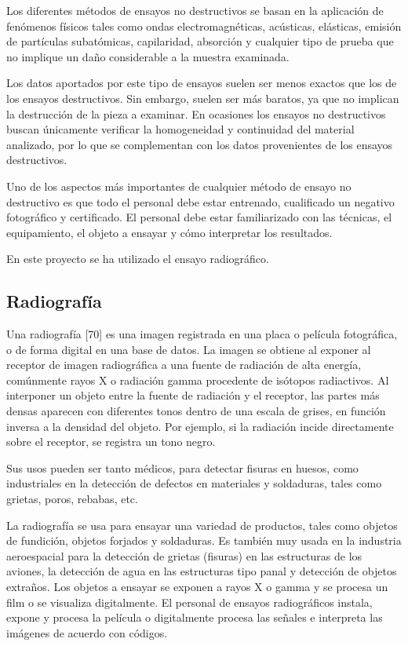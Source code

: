 Los diferentes métodos de ensayos no destructivos se basan en la aplicación de fenómenos físicos tales como ondas electromagnéticas, acústicas, elásticas, emisión de partículas subatómicas, capilaridad, absorción y cualquier tipo de prueba que no implique un daño considerable a la muestra examinada.

Los datos aportados por este tipo de ensayos suelen ser menos exactos que los de los ensayos destructivos. Sin embargo, suelen ser más baratos, ya que no implican la destrucción de la pieza a examinar. En ocasiones los ensayos no destructivos buscan únicamente verificar la homogeneidad y continuidad del material analizado, por lo que se complementan con los datos provenientes de los ensayos destructivos.

Uno de los aspectos más importantes de cualquier método de ensayo no destructivo es que todo el personal debe estar entrenado, cualificado un negativo fotográfico y certificado. El personal debe estar familiarizado con las técnicas, el equipamiento, el objeto a ensayar y cómo interpretar los resultados.

En este proyecto se ha utilizado el ensayo radiográfico.

\subsection{Radiografía}
Una radiografía [70] es una imagen registrada en una placa o película fotográfica, o de forma digital en una base de datos. La imagen se obtiene al exponer al receptor de imagen radiográfica a una fuente de radiación de alta energía, comúnmente rayos X o radiación gamma procedente de isótopos radiactivos. Al interponer un objeto entre la fuente de radiación y el receptor, las partes más densas aparecen con diferentes tonos dentro de una escala de grises, en función inversa a la densidad del objeto. Por ejemplo, si la radiación incide directamente sobre el receptor, se registra un tono negro.

Sus usos pueden ser tanto médicos, para detectar fisuras en huesos, como industriales en la detección de defectos en materiales y soldaduras, tales como grietas, poros, rebabas, etc.

La radiografía se usa para ensayar una variedad de productos, tales como objetos de fundición, objetos forjados y soldaduras. Es también muy usada en la industria aeroespacial para la detección de grietas (fisuras) en las estructuras de los aviones, la detección de agua en las estructuras tipo panal y detección de objetos extraños. Los objetos a ensayar se exponen a rayos X o gamma y se procesa un film o se visualiza digitalmente. El personal de ensayos radiográficos instala, expone y procesa la película o digitalmente procesa las señales e interpreta las imágenes de acuerdo con códigos.


